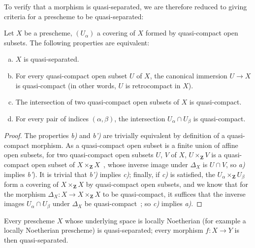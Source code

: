
To verify that a morphism is quasi-separated, we are therefore reduced to giving
criteria for a prescheme to be quasi-separated:

\begin{proposition}[1.2.7]
\label{IV.1.2.7}
Let $X$ be a prescheme, $(U_\alpha)$ a covering of $X$ formed by quasi-compact open subsets. The following properties are equivalent:
\begin{enumerate}[a)]
  \item $X$ is quasi-separated.
  \item For every quasi-compact open subset $U$ of $X$, the canonical immersion $U\to X$ is quasi-compact
    (in other words, $U$ is retrocompact in $X$).
  \item[b')] The intersection of two quasi-compact open subsets of $X$ is quasi-compact.
  \item For every pair of indices $(\alpha,\beta)$, the intersection $U_\alpha\cap U_\beta$ is quasi-compact.
\end{enumerate}
\end{proposition}

\begin{proof}
The properties \emph{b)} and \emph{b')} are trivially equivalent by definition of a quasi-compact
morphism. As a quasi-compact open subset is a finite union of affine open subsets,
for two quasi-compact open subsets $U$, $V$ of $X$, $U\times_{\mathbf{Z}} V$ is a quasi-compact open subset
of $X\times_{\mathbf{Z}} X$~, whose inverse image under $\Delta_X$ is $U\cap V$, so \emph{a)} implies \emph{b'}).
It is trivial that \emph{b')} implies \emph{c)}; finally, if \emph{c)} is satisfied, the $U_\alpha\times_{\mathbf{Z}} U_\beta$ form a
covering of $X\times_{\mathbf{Z}} X$ by quasi-compact open subsets, and we know that for the
morphism $\Delta_X:X\to X\times_{\mathbf{Z}} X$ to be quasi-compact, it suffices that the inverse images
$U_\alpha\cap U_\beta$ under $\Delta_X$ be quasi-compact~; so \emph{c)} implies \emph{a)}.
\end{proof}

\begin{corollary}[1.2.8]
\label{IV.1.2.8}
Every prescheme $X$ whose underlying space is locally Noetherian
\textnormal{(}for example a locally Noetherian prescheme\textnormal{)} is quasi-separated; every morphism $f:X\to Y$ is
then quasi-separated.
\end{corollary}

